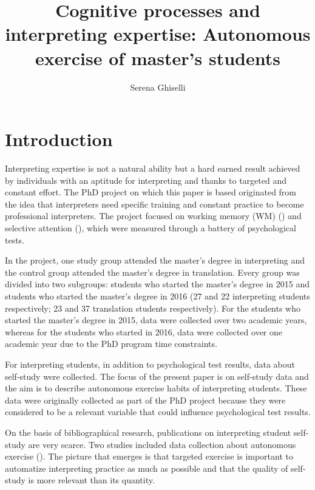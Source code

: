 \documentclass[output=paper]{../langscibook}
\author{Serena Ghiselli\affiliation{University of Bologna}}
\title{Cognitive processes and interpreting expertise: Autonomous exercise of master’s students}
\begin{document}
\maketitle
{}


\section{Introduction}


Interpreting expertise is not a natural ability but a hard earned result achieved by individuals with an aptitude for interpreting and thanks to targeted and constant effort. The PhD project on which this paper is based originated from the idea that interpreters need specific training and constant practice to become professional interpreters. The project focused on working memory (WM) (\citealt{BaddeleyHitch1974,Baddeley2000,Gerver1975,Gerver1976,PadillaBenitez1995}) and selective attention (\citealt{Cowan2000,Moser-Mercer2000,Seeber2011,TimarovaEtAl2014,TimarovaEtAl2015}), which were measured through a battery of psychological tests.

In the project, one study group attended the master’s degree in interpreting and the control group attended the master’s degree in translation. Every group was divided into two subgroups: students who started the master’s degree in 2015 and students who started the master’s degree in 2016 (27 and 22 interpreting students respectively; 23 and 37 translation students respectively). For the students who started the master’s degree in 2015, data were collected over two academic years, whereas for the students who started in 2016, data were collected over one academic year due to the PhD program time constraints.

For interpreting students, in addition to psychological test results, data about self-study were collected. The focus of the present paper is on self-study data and the aim is to describe autonomous exercise habits of interpreting students. These data were originally collected as part of the PhD project because they were considered to be a relevant variable that could influence psychological test results.

On the basis of bibliographical research, publications on interpreting student self-study are very scarce. Two studies included data collection about autonomous exercise (\citealt{Fan2012,Wang2016}). The picture that emerges is that targeted exercise is important to automatize interpreting practice as much as possible and that the quality of self-study is more relevant than its quantity.
\end{document}
